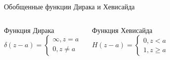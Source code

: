 \documentclass[ignoreonframetext,unicode]{beamer}
\begin{document}
	\begin{frame}{Обобщенные функции Дирака и Хевисайда}	
		
		\begin{columns}
					\begin{block}{Функция Дирака}	
				\[
				\delta (z - a) = 
				\begin{cases}
					\infty, z = a \\
					0, z \neq  a	
				\end{cases}
				\]
			\end{block}
			\begin{block}{Функция Хевисайда}	
				\[
				H(z - a) = 
				\begin{cases}
					0, z < a \\
					1, z \geqslant a	
				\end{cases}
				\]
			\end{block}
		\end{columns}
		

\end{frame}
\end{document}
